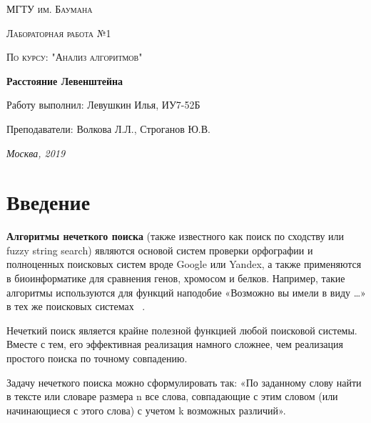 \documentclass[12pt]{report}
\begin{document}
	\begin{titlepage}
		\centering
		{\scshape\LARGE МГТУ им. Баумана \par}
		\vspace{3cm}
		{\scshape\Large Лабораторная работа №1\par}
		\vspace{0.5cm}	
		{\scshape\Large По курсу: "Анализ алгоритмов"\par}
		\vspace{1.5cm}
		{\huge\bfseries Расстояние Левенштейна\par}
		\vspace{2cm}
		{\Large Работу выполнил: Левушкин Илья, ИУ7-52Б\par}
		\vspace{0.5cm}
		{\Large Преподаватели:  Волкова Л.Л., Строганов Ю.В.\par}
		
		\vfill
		\large \textit {Москва, 2019} \par
	\end{titlepage}

    \tableofcontents
    
    \newpage
    \chapter*{Введение}
    
    
    \textbf{Алгоритмы нечеткого поиска} (также известного как поиск по сходству или fuzzy string search) являются основой систем проверки орфографии и полноценных поисковых систем вроде Google или Yandex, а также применяются в биоинформатике для сравнения генов, хромосом и белков. Например, такие алгоритмы используются для функций наподобие «Возможно вы имели в виду …» в тех же поисковых системах ~\cite{Algorithms}.
    \vspace{0.5cm}
    
    Нечеткий поиск является крайне полезной функцией любой поисковой системы. Вместе с тем, его эффективная реализация намного сложнее, чем реализация простого поиска по точному совпадению.
    \vspace{0.5cm}
    
    Задачу нечеткого поиска можно сформулировать так:
    «По заданному слову найти в тексте или словаре размера n все слова, совпадающие с этим словом (или начинающиеся с этого слова) с учетом k возможных различий».
    \vspace{0.5cm}
    
\end{document}
